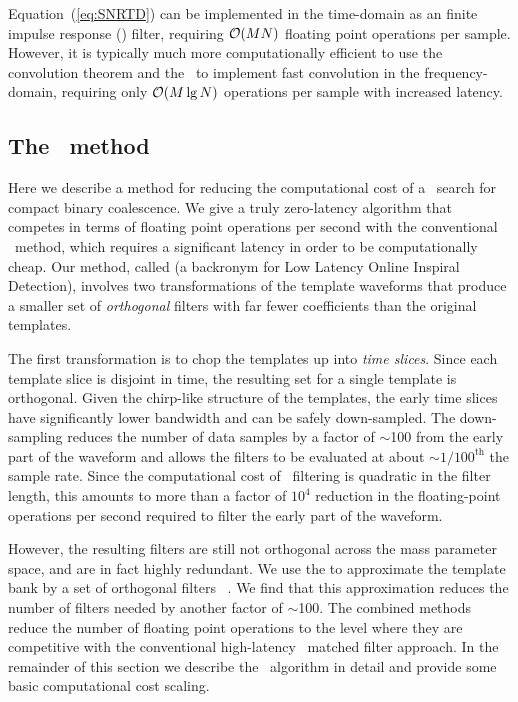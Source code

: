 Equation~(\ref{eq:SNRTD}) can be implemented in the time-domain as an
finite impulse response (\fir) filter, requiring $\mathcal O(M
N)$ floating point operations per sample.  However, it is typically
much more computationally efficient to use the convolution theorem and the
\fft\ to implement fast convolution in the frequency-domain, requiring only
$\mathcal O(M \lg N)$ operations per sample with increased
latency.


\subsection{The \lloid\ method}

Here we describe a method for reducing the computational cost of a \TD\ search
for compact binary coalescence.  We give a truly zero-latency algorithm
that competes in terms of floating point operations per second with the
conventional \FD\ method, which requires a significant latency in order to be
computationally cheap. Our method, called \lloid{} (a backronym for
Low Latency Online Inspiral Detection),
involves two transformations of the template waveforms that produce a
smaller set of \emph{orthogonal} filters with far fewer coefficients than
 the original templates.

The first transformation is to chop the \TD{} templates up into \emph{time
slices}.  Since each template slice is disjoint in time, the resulting set for
a single template is orthogonal.  Given the chirp-like structure of the
templates, the early time slices have significantly lower bandwidth and can be
safely down-sampled.  The down-sampling reduces the number of data samples by a
factor of $\sim$100 from the early part of the waveform and allows the filters
to be evaluated at about $\sim$$1/100^\mathrm{th}$ the sample rate. Since the
computational cost of \TD\ filtering is quadratic in the filter length, this
amounts to more than a factor of $10^4$ reduction in the floating-point operations
 per second required to filter the early part of the waveform.

However, the resulting filters are still not
orthogonal across the mass parameter space, and are in fact highly redundant.
We use the \SVD{} to approximate the template bank by a set of orthogonal filters
~\citep{Cannon:2010p10398}.  We find that this approximation
reduces the number of filters needed by another factor of
$\sim$100.  The combined methods reduce the number of floating point operations
to the level where they are competitive with the conventional high-latency \FD\
matched filter approach.  In the remainder of this section we describe the
\lloid\ algorithm in detail and provide some basic computational cost scaling.

